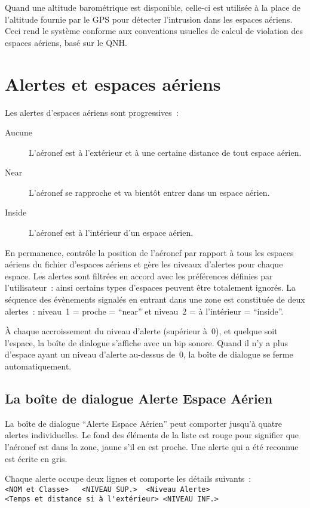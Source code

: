 Quand une altitude barométrique est disponible, celle-ci est utilisée à la place de l'altitude fournie par le GPS pour détecter l'intrusion dans les espaces aériens. Ceci rend le système conforme aux conventions usuelles de calcul de violation des espaces aériens, basé sur le QNH.


\section{Alertes et espaces aériens}

Les alertes d'espaces aériens sont progressives~:
\begin{description}
\item[Aucune] L'aéronef est à l'extérieur et à une certaine distance de tout espace aérien.
\item[\colorbox{AirspaceYellow}{Near}] L'aéronef se rapproche et va bientôt entrer dans un espace aérien.
\item[\colorbox{AirspaceRed}{Inside}] L'aéronef est à l'intérieur d'un espace aérien.
\end{description}

En permanence, \xc{} contrôle la position de l'aéronef par rapport à tous les espaces aériens du fichier d'espaces aériens et gère les niveaux d'alertes pour chaque espace. Les alertes sont filtrées en accord avec les préférences définies par l'utilisateur~: ainsi certains types d'espaces peuvent être totalement ignorés.
La séquence des évènements signalés en entrant dans une zone est constituée de deux alertes~: niveau~1 = proche = ``near'' et niveau~2 = à l'intérieur = ``inside''.

À chaque accroissement du niveau d'alerte (supérieur à~0), et quelque soit l'espace, la boîte de dialogue s'affiche avec un bip sonore. Quand il n'y a plus d'espace ayant un niveau d'alerte au-dessus de~0, la boîte de dialogue se ferme automatiquement.

\subsection*{La boîte de dialogue Alerte Espace Aérien}

La boîte de dialogue ``Alerte Espace Aérien'' peut comporter jusqu'à quatre alertes individuelles. Le fond des éléments de la liste est rouge pour signifier que l'aéronef est dans la zone, jaune s'il en est proche. Une alerte qui a été reconnue est écrite en gris.

Chaque alerte occupe deux lignes et comporte les détails suivants~:\\
\verb+<NOM et Classe>   <NIVEAU SUP.>  <Niveau Alerte>+  \\
\verb+<Temps et distance si à l'extérieur> <NIVEAU INF.>+

